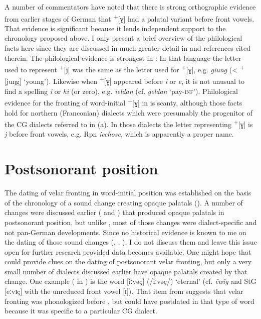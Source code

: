 A number of commentators have noted that there is strong orthographic evidence from earlier stages of German that  \textsuperscript{+}[ɣ] had a palatal variant before front vowels. That evidence is significant because it lends independent support to the chronology proposed above. I only present a brief overview of the philological facts here since they are discussed in much greater detail in \citet{VanderHoek2010} and references cited therein. The philological evidence is strongest in : In that language the letter used to represent  \textsuperscript{+}[j] was the same as the letter used for  \textsuperscript{+}[ɣ], e.g. \textit{giung} (< \textsuperscript{+}[juŋg] ‘young’). Likewise when  \textsuperscript{+}[ɣ] appeared before \textit{i} or \textit{e}, it is not unusual to find a spelling \textit{i} or \textit{hi} (or zero), e.g. \textit{ieldan} (cf. \textit{geldan} ‘pay\textsc{{}-inf}’). Philological evidence for the fronting of word-initial  \textsuperscript{+}[ɣ] in  is scanty, although those facts hold for northern (Franconian) dialects which were presumably the progenitor of the CG dialects referred to in (a). In those  dialects the letter representing  \textsuperscript{+}[ɣ] is \textit{j} before front vowels, e.g. Rpn \textit{iechose}, which is apparently a proper name.

\section{{Postsonorant} {position}}\label{sec:16.3}

The dating of velar fronting in word-initial position was established on the basis of the chronology of a sound change creating opaque palatals (). A number of changes were discussed earlier ( and ) that produced opaque palatals in postsonorant position, but unlike , most of those changes were dialect-specific and not pan-German developments. Since no historical evidence is known to me on the dating of those sound changes (, , ), I do not discuss them and leave this issue open for further research provided data becomes available. One might hope that  could provide clues on the dating of postsonorant velar fronting, but only a very small number of dialects discussed earlier have opaque palatals created by that change. One example ( in ) is the word [iːvəç] (/iːvəç/) ‘eternal’ (cf. \textit{ēwīg} and StG [eːvɪç] with the unreduced front vowel [ɪ]). That item from  suggests that velar fronting was phonologized before , but  could have postdated  in that type of word because it was specific to a particular CG dialect.

